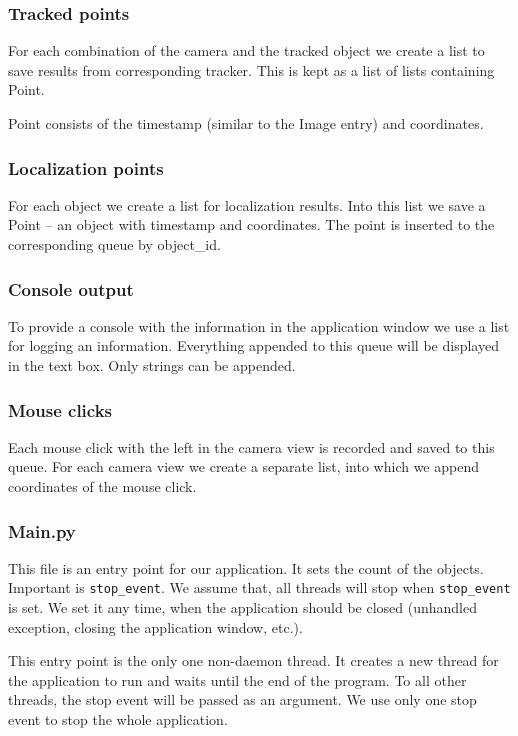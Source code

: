 \subsubsection{Tracked points}

For each combination of the camera and the tracked object we create a list to
save results from corresponding tracker. This is kept as a list of lists
containing Point.

Point consists of the timestamp (similar to the Image entry) and coordinates.

\subsubsection{Localization points}

For each object we create a list for localization results. Into this list we
save a Point -- an object with timestamp and coordinates. The point is inserted
to the corresponding queue by object{\_}id.

\subsubsection{Console output}

To provide a console with the information in the application window we use a
list for logging an information. Everything appended to this queue will be
displayed in the text box. Only strings can be appended.

\subsubsection{Mouse clicks}

Each mouse click with the left in the camera view is recorded and saved to this
queue. For each camera view we create a separate list, into which we append
coordinates of the mouse click.

\subsubsection*{Main.py}

This file is an entry point for our application. It sets the count of the
objects. Important is \verb+stop_event+. We assume that, all threads will stop
when \verb+stop_event+ is set. We set it any time, when the application should
be closed (unhandled exception, closing the application window, etc.).

This entry point is the only one non-daemon thread. It creates a new thread for
the application to run and waits until the end of the program. To all other
threads, the stop event will be passed as an argument. We use only one stop
event to stop the whole application.


